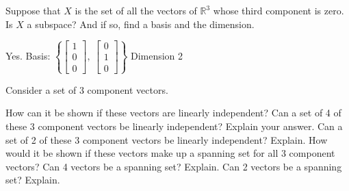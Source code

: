 \begin{exercise}
Suppose that $X$ is the set of all the vectors of ${\mathbb{R}}^3$ whose
third component is zero.  Is $X$ a subspace?  And if so, find a basis
and the dimension.
\end{exercise}
\comboSol{%
}
{%
Yes. Basis: $\left\{\left[\begin{smallmatrix} 1 \\ 0 \\ 0 \end{smallmatrix}\right],\ \left[\begin{smallmatrix} 0 \\ 1 \\ 0 \end{smallmatrix}\right]\right\}$ Dimension 2
}

\begin{exercise}\ansMark%
Consider a set of 3 component vectors.
\begin{tasks}
\task How can it be shown if these vectors are linearly independent?
\task Can a set of 4 of these 3 component vectors be linearly independent? Explain your answer.
\task Can a set of 2 of these 3 component vectors be linearly independent? Explain.
\task How would it be shown if these vectors make up a spanning set for all 3 component vectors?
\task Can 4 vectors be a spanning set? Explain.
\task Can 2 vectors be a spanning set? Explain.
\end{tasks}
\end{exercise}

